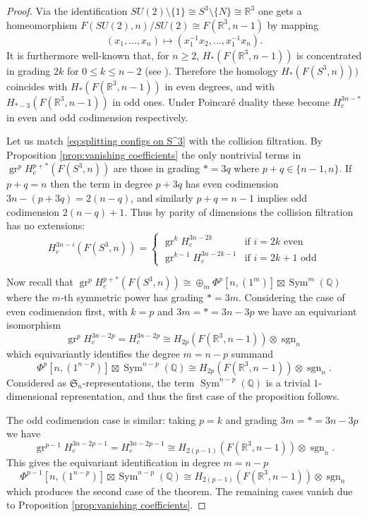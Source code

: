 \documentclass[12pt]{article}
\newcommand{\Q}{\mathbb{Q}}
\newcommand{\R}{\mathbb{R}}
\newcommand{\SymGroup}[1][n]{\mathfrak{S}_{#1}}
\newcommand{\sgn}[1][n]{\operatorname{sgn}_{#1}}
\DeclareMathOperator{\gr}{gr}
\DeclareMathOperator{\Sym}{Sym}
\theoremstyle{plain}
\theoremstyle{definition}
\theoremstyle{remark}
\begin{document}
\begin{proof}
    Via the identification $SU(2)\setminus \{1\} \cong S^3\setminus \{N\} \cong \R^3$ one gets a homeomorphism $F(SU(2),n)/SU(2) \cong F(\R^3,n-1)$ by mapping
    \[
    (x_1,\ldots,x_n) \mapsto (x_1^{-1}x_2, \ldots, x_1^{-1}x_n).
    \]
    It is furthermore well-known that, for $n\geq 2$, $H_*(F(\R^3,n-1))$ is concentrated in grading $2k$ for $0\leq k \leq n-2$ (see \cite[Lemma 6.2]{Cohen76}). Therefore the homology $H_*(F(S^3,n)))$ coincides with $H_*(F(\R^3,n-1))$ in even degrees, and with $H_{*-3}(F(\R^3,n-1))$ in odd ones. Under Poincar\'{e} duality these become $H^{3n-*}_c$ in even and odd codimension respectively.
    
    Let us match \eqref{eq:splitting configs on S^3} with the collision filtration. By Proposition \ref{prop:vanishing coefficients} the only nontrivial terms in $\gr^p H^{p+*}_c(F(S^3,n))$ are those in grading $*=3q$ where $p+q\in \{n-1,n\}$. If $p+q=n$ then the term in degree $p+3q$ has even codimension $3n-(p+3q)=2(n-q)$, and similarly $p+q=n-1$ implies odd codimension $2(n-q)+1$. Thus by parity of dimensions the collision filtration has no extensions:
    \begin{equation}
        H^{3n-i}_c(F(S^3,n)) = \begin{cases}
        \gr^{k} H^{3n-2k}_c &\text{if $i=2k$ even} \\
        \gr^{k-1} H^{3n-2k-1}_c &\text{if $i=2k+1$ odd}
    \end{cases}
    \end{equation}
    
    Now recall that $\gr^p H^{p+*}_c(F(S^3,n)) \cong \oplus_m \Phi^p[n,(1^m)]\boxtimes \Sym^m(\Q)$ where the $m$-th symmetric power has grading $*=3m$. Considering the case of even codimension first, with $k=p$ and $3m = * = 3n-3p$ we have an equivariant isomorphism
    \[
    \gr^p H_c^{3n-2p} = H_c^{3n-2p} \cong H_{2p}(F(\R^3,n-1))\otimes \sgn
    \]
    which equivariantly identifies the degree $m=n-p$ summand
    \begin{equation}
    \Phi^p[n,(1^{n-p})]\boxtimes \Sym^{n-p}(\Q) \cong H_{2p}(F(\R^3,n-1))\otimes \sgn.
    \end{equation}
    Considered as $\SymGroup$-representations, the term $\Sym^{n-p}(\Q)$ is a trivial $1$-dimensional representation, and thus the first case of the proposition follows.   
    
    The odd codimension case is similar: taking $p=k$ and grading $3m = * = 3n-3p$ we have
    \[
    \gr^{p-1} H^{3n-2p-1}_c = H^{3n-2p-1}_c \cong H_{2(p-1)}(F(\R^3,n-1))\otimes\sgn.
    \]
    This gives the equivariant identification in degree $m=n-p$
    \begin{equation}
        \Phi^{p-1}[n,(1^{n-p})]\boxtimes \Sym^{n-p}(\Q) \cong H_{2(p-1)}(F(\R^3,n-1))\otimes \sgn
    \end{equation}
    which produces the second case of the theorem. The remaining cases vanish due to Proposition \ref{prop:vanishing coefficients}.
\end{proof}
\end{document}
